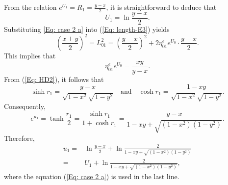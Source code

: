 \documentclass[12pt]{amsart}
\theoremstyle{definition}
\begin{document}
From the relation $e^{U_1}=R_1=\frac{y-x}{2}$, it is straightforward to deduce that
\begin{equation}\label{Eq: case 2 a}
U_1=\ln \frac{y-x}{2}.
\end{equation}
Substituting \eqref{Eq: case 2 a} into (\ref{Eq: length-E3}) yields
\begin{equation*}
\left(\frac{x+y}{2}\right)^2=L_{01}^2
=\left(\frac{y-x}{2}\right)^2+2\eta_{01}^ee^{U_0}\cdot \frac{y-x}{2}.
\end{equation*}
This implies that
\begin{equation}\label{Eq: Euclidean i0j1}
\eta_{01}^ee^{U_0}=\frac{xy}{y-x}.
\end{equation}
From (\ref{Eq: HD2}), it follows that
\begin{equation}\label{Eq: F45}
\sinh r_1=\frac{y-x}{\sqrt{1-x^2}\sqrt{1-y^2}}
\quad \text{and} \quad
\cosh r_1=\frac{1-xy}{\sqrt{1-x^2}\sqrt{1-y^2}}.
\end{equation}
Consequently,
\begin{equation}\label{Eq: F49}
e^{u_1}=\tanh \frac{r_1}{2}
=\frac{\sinh r_1}{1+\cosh r_1}
=\frac{y-x}{1-xy+\sqrt{(1-x^2)(1-y^2)}}.
\end{equation}
Therefore,
\begin{equation}\label{Eq: F19}
\begin{aligned}
u_1=&\ln \frac{y-x}{2}+\ln \frac{2}{1-xy+\sqrt{(1-x^2)(1-y^2)}}\\
=&U_1+\ln \frac{2}{1-xy+\sqrt{(1-x^2)(1-y^2)}},
\end{aligned}
\end{equation}
where the equation (\ref{Eq: case 2 a}) is used in the last line.
\end{document}
